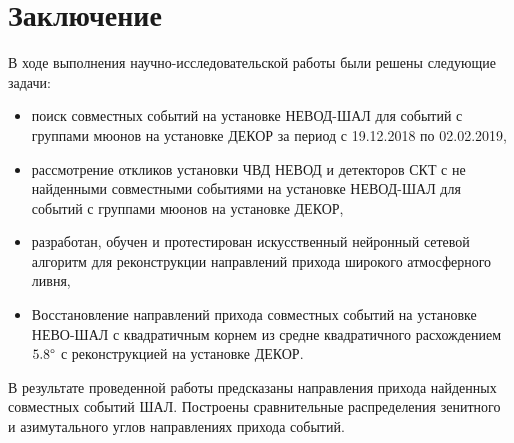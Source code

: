 \chapter*{Заключение}
\label{ch:intro}

В ходе выполнения научно-исследовательской работы были решены следующие задачи:
\begin{itemize}
    \item поиск совместных событий на установке НЕВОД-ШАЛ для событий с группами мюонов на установке ДЕКОР за период с 19.12.2018 по 02.02.2019,
    \item рассмотрение откликов установки ЧВД НЕВОД и детекторов СКТ с не найденными совместными событиями на установке НЕВОД-ШАЛ для событий  с группами мюонов на установке ДЕКОР,
    \item разработан, обучен и протестирован искусственный нейронный сетевой алгоритм для реконструкции направлений прихода широкого атмосферного ливня,
    \item Восстановление направлений прихода совместных событий на установке НЕВО-ШАЛ с квадратичным корнем из средне квадратичного расхождением \(5.8 \degree\) с реконструкцией на установке ДЕКОР.
\end{itemize}

В результате проведенной работы предсказаны направления прихода найденных совместных событий ШАЛ. Построены сравнительные распределения зенитного и азимутального углов направлениях прихода событий. 




\endinput